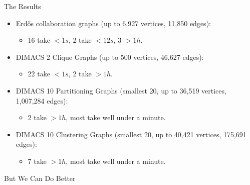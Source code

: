 \documentclass{beamer}
\begin{document}
\begin{frame}{The Results}
    \begin{itemize}
        \item Erd\H{o}s collaboration graphs (up to 6,927 vertices, 11,850 edges):
            \begin{itemize}
                \item 16 take $<1s$, 2 take $<12s$, 3 $>1h$.
            \end{itemize}

        \item DIMACS 2 Clique Graphs (up to 500 vertices, 46,627 edges):
            \begin{itemize}
                \item 22 take $<1s$, 2 take $>1h$.
            \end{itemize}

        \item DIMACS 10 Partitioning Graphs (smallest 20, up to 36,519 vertices, 1,007,284 edges):
            \begin{itemize}
                \item 2 take $>1h$, most take well under a minute.
            \end{itemize}

        \item DIMACS 10 Clustering Graphs (smallest 20, up to 40,421 vertices, 175,691 edges):
            \begin{itemize}
                \item 7 take $>1h$, most take well under a minute.
            \end{itemize}
    \end{itemize}
\end{frame}

\begin{frame}{But We Can Do Better}
    \centering
\end{frame}
\end{document}
